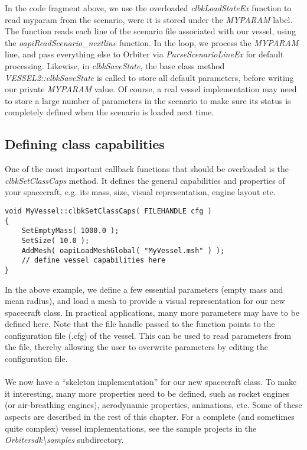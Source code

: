 \documentclass[Orbiter Developer Manual.tex]{subfiles}
\begin{document}
\noindent
In the code fragment above, we use the overloaded \textit{clbkLoadStateEx} function to read myparam from the scenario, were it is stored under the \textit{MYPARAM} label. The function reads each line of the scenario file associated with our vessel, using the \textit{oapiReadScenario\_nextline} function. In the loop, we process the \textit{MYPARAM} line, and pass everything else to Orbiter via \textit{ParseScenarioLineEx} for default processing. Likewise, in \textit{clbkSaveState}, the base class method \textit{VESSEL2::clbkSaveState} is called to store all default parameters, before writing our private \textit{MYPARAM} value. Of course, a real vessel implementation may need to store a large number of parameters in the scenario to make sure its status is completely defined when the scenario is loaded next time.


\subsection{Defining class capabilities}
One of the most important callback functions that should be overloaded is the \textit{clbkSetClassCaps} method. It defines the general capabilities and properties of your spacecraft, e.g. its mass, size, visual representation, engine layout etc.

\begin{lstlisting}
void MyVessel::clbkSetClassCaps( FILEHANDLE cfg )
{
	SetEmptyMass( 1000.0 );
	SetSize( 10.0 );
	AddMesh( oapiLoadMeshGlobal( "MyVessel.msh" ) );
	// define vessel capabilities here
}
\end{lstlisting}

\noindent
In the above example, we define a few essential parameters (empty mass and mean radius), and load a mesh to provide a visual representation for our new spacecraft class. In practical applications, many more parameters may have to be defined here. Note that the file handle passed to the function points to the configuration file (.cfg) of the vessel. This can be used to read parameters from the file, thereby allowing the user to overwrite parameters by editing the configuration file.\\
\\
We now have a “skeleton implementation” for our new spacecraft class. To make it interesting, many more properties need to be defined, such as rocket engines (or air-breathing engines), aerodynamic properties, animations, etc. Some of these aspects are described in the rest of this chapter. For a complete (and sometimes quite complex) vessel implementations, see the sample projects in the \textit{Orbitersdk\textbackslash samples} subdirectory.
\end{document}
